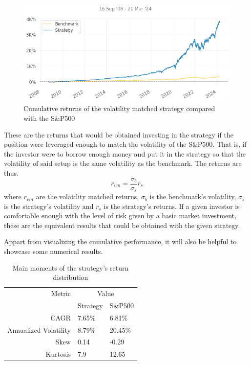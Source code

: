 \begin{figure}[ht]
    \captionsetup{justification=centering}
    \includegraphics[width=\linewidth]{assets/strat-vs-sp500-vol-matched.png}
    \caption{Cumulative returns of the volatility matched strategy compared with the S\&P500}
    \label{fig:strat-vs-sp500-vol-matched}
\end{figure}
These are the returns that would be obtained investing in the strategy if the position were leveraged enough to match the volatility of the S\&P500. That is, if the investor were to borrow enough money and put it in the strategy so that the volatility of said setup is the same volatility as the benchmark. The returns are thus:
\begin{equation}
    r_{vm}=\frac{\sigma_b}{\sigma_s}r_s
\end{equation}
where $r_{vm}$ are the volatility matched returns, $\sigma_b$ is the benchmark's volatility, $\sigma_s$ is the strategy's volatility and $r_s$ is the strategy's returns. 
If a given investor is comfortable enough with the level of risk given by a basic market investment, these are the equivalent results that could be obtained with the given strategy.

Appart from visualizing the cumulative performance, it will also be helpful to showcase some numerical results. 

\begin{table}[ht]
    \centering
    \begin{tabular}{rll}
        \toprule
        Metric & \multicolumn{2}{c}{Value} \\ 
        \cmidrule(lr){2-3}
            & Strategy & S\&P500 \\
        \midrule
        CAGR & 7.65\% & 6.81\% \\
        Annualized Volatility & 8.79\% & 20.45\% \\
        Skew & 0.14 & -0.29 \\
        Kurtosis & 7.9 & 12.65 \\
        \bottomrule
    \end{tabular}
    \caption{Main moments of the strategy's return distribution}
    \label{table:main-moments-strat-vs-sp500}
\end{table}

